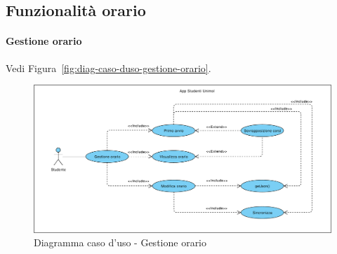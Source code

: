 \subsection{Funzionalità orario}

\paragraph{Gestione orario\\}

Vedi Figura~\vref{fig:diag-caso-duso-gestione-orario}.

\begin{figure}[h]
	\centering
	\includegraphics[width=\textwidth]{imgs/gruppo2/usecase-diagram-orario.pdf}
	\caption{Diagramma caso d'uso - Gestione orario}
	\label{fig:diag-caso-duso-gestione-orario}
\end{figure}

\clearpage